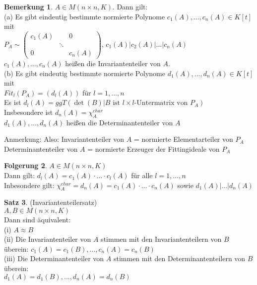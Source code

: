 \documentclass[10pt,a4paper,numbers=endperiod]{scrartcl}
\theoremstyle{definition}
\newtheorem{satz}{Satz}[section]
\newtheorem{bem}[satz]{Bemerkung}
\newtheorem{folg}[satz]{Folgerung}
\begin{document}
\begin{bem}
	$A \in M(n \times n, K)$. Dann gilt:\\
	(a) Es gibt eindeutig bestimmte normierte Polynome $c_1(A), \ldots, c_n(A) \in K[t]$ mit\\
	$P_A \sim \begin{pmatrix}
	c_1(A) & & 0\\
	& \ddots &\\
	0 & & c_n(A)
	\end{pmatrix}$, $c_1(A)|c_2(A)|\ldots|c_n(A)$\\
	$c_1(A), \ldots, c_n(A)$ heißen die Invariantenteiler von $A$.\\
	
	(b) Es gibt eindeutig bestimmte normierte Polynome $d_1(A), \ldots, d_n(A) \in K[t]$ mit\\
	$Fit_l(P_A) = (d_l(A))$ für $l = 1, \ldots, n$\\
	Es ist $d_l(A) = ggT(\det(B)| B \text{ ist } l \times l \text{-Untermatrix von } P_A)$\\
	Insbesondere ist $d_n(A) = \chi_A^{char}$\\
	$d_1(A), \ldots, d_n(A)$ heißen die Determinantenteiler von $A$
\end{bem}

Anmerkung: Also: Invariantenteiler von $A$ = normierte Elementarteiler von $P_A$\\
Determinantenteiler von $A$ = normierte Erzeuger der Fittingideale von $P_A$

\begin{folg}
	$A \in M(n \times n, K)$\\
	Dann gilt: $d_l(A) = c_1(A) \cdot \ldots \cdot c_l(A)$ für alle $l = 1, \ldots, n$\\
	Inbesondere gilt: $\chi_A^{char} = d_n(A) = c_1(A) \cdot \ldots \cdot c_n(A)$ sowie $d_1(A)| \ldots | d_n(A)$
\end{folg}

\begin{satz}
	(Invariantenteilersatz)\\
	$A, B \in M(n \times n, K)$\\
	Dann sind äquivalent:\\
	(i) $A \approx B$\\
	(ii) Die Invariantenteiler von $A$ stimmen mit den Invariantenteilern von $B$ überein: $c_1(A) = c_1(B), \ldots, c_n(A) = c_n(B)$\\
	(iii) Die Determinantenteiler von $A$ stimmen mit den Determinantenteilern von $B$ überein:\\ $d_1(A) = d_1(B), \ldots, d_n(A) = d_n(B)$
\end{satz}
\end{document}
